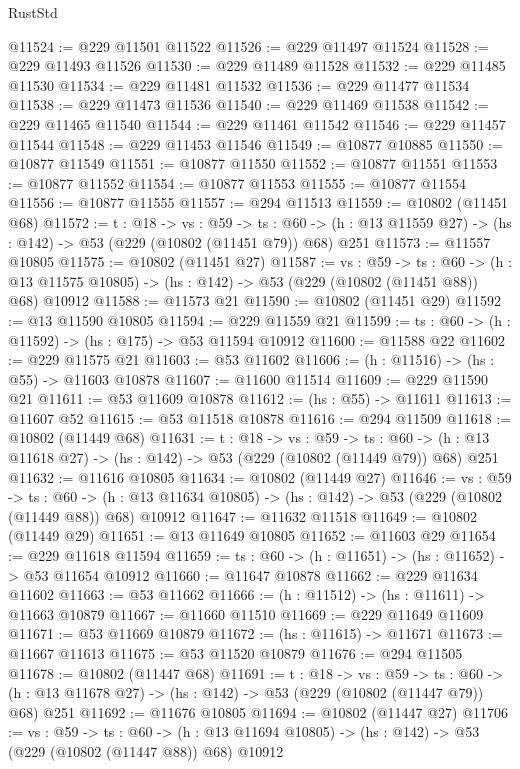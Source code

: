 \begin{lexlean}{RustStd}
\begin{coremodule}
@11524 := @229 @11501 @11522
@11526 := @229 @11497 @11524
@11528 := @229 @11493 @11526
@11530 := @229 @11489 @11528
@11532 := @229 @11485 @11530
@11534 := @229 @11481 @11532
@11536 := @229 @11477 @11534
@11538 := @229 @11473 @11536
@11540 := @229 @11469 @11538
@11542 := @229 @11465 @11540
@11544 := @229 @11461 @11542
@11546 := @229 @11457 @11544
@11548 := @229 @11453 @11546
@11549 := @10877 @10885
@11550 := @10877 @11549
@11551 := @10877 @11550
@11552 := @10877 @11551
@11553 := @10877 @11552
@11554 := @10877 @11553
@11555 := @10877 @11554
@11556 := @10877 @11555
@11557 := @294 @11513
@11559 := @10802 (@11451 @68)
@11572 := {t : @18} ->
  {vs : @59} ->
  {ts : @60} -> (h : @13 @11559 @27) -> (hs : @142) -> @53 (@229 (@10802 (@11451 @79)) @68) @251
@11573 := @11557 @10805
@11575 := @10802 (@11451 @27)
@11587 := {vs : @59} ->
  {ts : @60} ->
  (h : @13 @11575 @10805) -> (hs : @142) -> @53 (@229 (@10802 (@11451 @88)) @68) @10912
@11588 := @11573 @21
@11590 := @10802 (@11451 @29)
@11592 := @13 @11590 @10805
@11594 := @229 @11559 @21
@11599 := {ts : @60} -> (h : @11592) -> (hs : @175) -> @53 @11594 @10912
@11600 := @11588 @22
@11602 := @229 @11575 @21
@11603 := @53 @11602
@11606 := (h : @11516) -> (hs : @55) -> @11603 @10878
@11607 := @11600 @11514
@11609 := @229 @11590 @21
@11611 := @53 @11609 @10878
@11612 := (hs : @55) -> @11611
@11613 := @11607 @52
@11615 := @53 @11518 @10878
@11616 := @294 @11509
@11618 := @10802 (@11449 @68)
@11631 := {t : @18} ->
  {vs : @59} ->
  {ts : @60} -> (h : @13 @11618 @27) -> (hs : @142) -> @53 (@229 (@10802 (@11449 @79)) @68) @251
@11632 := @11616 @10805
@11634 := @10802 (@11449 @27)
@11646 := {vs : @59} ->
  {ts : @60} ->
  (h : @13 @11634 @10805) -> (hs : @142) -> @53 (@229 (@10802 (@11449 @88)) @68) @10912
@11647 := @11632 @11518
@11649 := @10802 (@11449 @29)
@11651 := @13 @11649 @10805
@11652 := @11603 @29
@11654 := @229 @11618 @11594
@11659 := {ts : @60} -> (h : @11651) -> (hs : @11652) -> @53 @11654 @10912
@11660 := @11647 @10878
@11662 := @229 @11634 @11602
@11663 := @53 @11662
@11666 := (h : @11512) -> (hs : @11611) -> @11663 @10879
@11667 := @11660 @11510
@11669 := @229 @11649 @11609
@11671 := @53 @11669 @10879
@11672 := (hs : @11615) -> @11671
@11673 := @11667 @11613
@11675 := @53 @11520 @10879
@11676 := @294 @11505
@11678 := @10802 (@11447 @68)
@11691 := {t : @18} ->
  {vs : @59} ->
  {ts : @60} -> (h : @13 @11678 @27) -> (hs : @142) -> @53 (@229 (@10802 (@11447 @79)) @68) @251
@11692 := @11676 @10805
@11694 := @10802 (@11447 @27)
@11706 := {vs : @59} ->
  {ts : @60} ->
  (h : @13 @11694 @10805) -> (hs : @142) -> @53 (@229 (@10802 (@11447 @88)) @68) @10912

\end{coremodule}
\end{lexlean}
